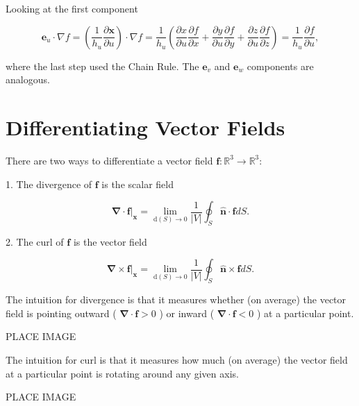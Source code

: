 \begin{formalproof}
  
Looking at the first component

\[
\boldsymbol{e}_u \cdot \nabla f=\left(\frac{1}{h_u} \frac{\partial \boldsymbol{x}}{\partial u}\right) \cdot \nabla f=\frac{1}{h_u}\left(\frac{\partial x}{\partial u} \frac{\partial f}{\partial x}+\frac{\partial y}{\partial u} \frac{\partial f}{\partial y}+\frac{\partial z}{\partial u} \frac{\partial f}{\partial z}\right)=\frac{1}{h_u} \frac{\partial f}{\partial u},
\]

where the last step used the Chain Rule. The \(\boldsymbol{e}_v\) and \(\boldsymbol{e}_w\) components are analogous.

\end{formalproof}

\section{Differentiating Vector Fields}

\begin{definition}
  There are two ways to differentiate a vector field \(\mathbf{f}: \mathbb{R}^3 \rightarrow \mathbb{R}^3\):

1. The divergence of \(\boldsymbol{f}\) is the scalar field

\[
\left.\boldsymbol{\nabla} \cdot \boldsymbol{f}\right|_{\boldsymbol{x}}=\lim _{\mathrm{d}(S) \rightarrow 0} \frac{1}{|V|} \oint_S \hat{\boldsymbol{n}} \cdot \boldsymbol{f} d S .
\]

2. The curl of \(\boldsymbol{f}\) is the vector field

\[
\boldsymbol{\nabla} \times\left.\boldsymbol{f}\right|_{\boldsymbol{x}}=\lim _{\mathrm{d}(S) \rightarrow 0} \frac{1}{|V|} \oint_S \hat{\boldsymbol{n}} \times \boldsymbol{f} d S .
\]

\end{definition}

\begin{remark}
  The intuition for divergence is that it measures whether (on average) the vector field is pointing outward ( \(\boldsymbol{\nabla} \cdot \boldsymbol{f}>0\) ) or inward ( \(\boldsymbol{\nabla} \cdot \boldsymbol{f}<0\) ) at a particular point.

PLACE IMAGE

The intuition for curl is that it measures how much (on average) the vector field at a particular point is rotating around any given axis.

PLACE IMAGE
\end{remark}

